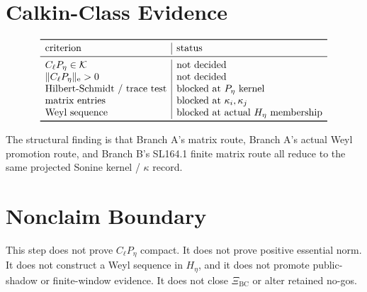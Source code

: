 \documentclass[11pt]{article}
\newcommand{\Cell}{C_\ell}
\newcommand{\Peta}{P_\eta}
\begin{document}
\section{Calkin-Class Evidence}

\[
\begin{array}{l|l}
\toprule
\text{criterion} & \text{status}\\
\midrule
\Cell\Peta\in\mathcal K & \text{not decided}\\
\|\Cell\Peta\|_{\mathrm e}>0 & \text{not decided}\\
\text{Hilbert-Schmidt / trace test} & \text{blocked at }\Peta\text{ kernel}\\
\text{matrix entries} & \text{blocked at }\kappa_i,\kappa_j\\
\text{Weyl sequence} & \text{blocked at actual }H_\eta\text{ membership}\\
\bottomrule
\end{array}
\]

The structural finding is that Branch A's matrix route, Branch A's actual Weyl
promotion route, and Branch B's SL164.1 finite matrix route all reduce to the
same projected Sonine kernel / \(\kappa\) record.

\section{Nonclaim Boundary}

This step does not prove \(\Cell\Peta\) compact.  It does not prove positive
essential norm.  It does not construct a Weyl sequence in \(H_\eta\), and it
does not promote public-shadow or finite-window evidence.  It does not close
\(\Xi_{\mathrm{BC}}\) or alter retained no-gos.
\end{document}
